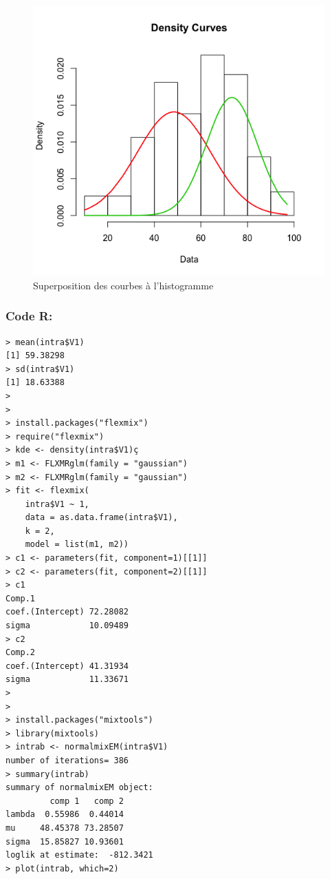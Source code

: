 \documentclass[10pt,twocolumn]{article}
\begin{document}
\begin{figure}[htbp]
	\caption{Superposition des courbes à l’histogramme}
	\label{intraPlot}
	\centering
	\includegraphics[width=\linewidth]{d1_intraPlot}
\end{figure}

\subsubsection*{Code R:}
\begin{verbatim}
> mean(intra$V1)
[1] 59.38298
> sd(intra$V1)
[1] 18.63388
>
>
> install.packages("flexmix")
> require("flexmix")
> kde <- density(intra$V1)ç
> m1 <- FLXMRglm(family = "gaussian")
> m2 <- FLXMRglm(family = "gaussian")
> fit <- flexmix(
    intra$V1 ~ 1,
    data = as.data.frame(intra$V1),
    k = 2,
    model = list(m1, m2))
> c1 <- parameters(fit, component=1)[[1]]
> c2 <- parameters(fit, component=2)[[1]]
> c1
Comp.1
coef.(Intercept) 72.28082
sigma            10.09489
> c2
Comp.2
coef.(Intercept) 41.31934
sigma            11.33671
>
>
> install.packages("mixtools")
> library(mixtools)
> intrab <- normalmixEM(intra$V1)
number of iterations= 386
> summary(intrab)
summary of normalmixEM object:
         comp 1   comp 2
lambda  0.55986  0.44014
mu     48.45378 73.28507
sigma  15.85827 10.93601
loglik at estimate:  -812.3421
> plot(intrab, which=2)
\end{verbatim}
\end{document}
